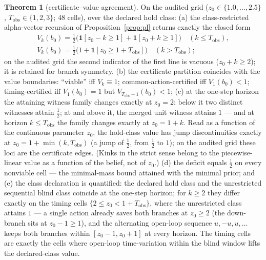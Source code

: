 \documentclass[10pt,twocolumn]{article}
\theoremstyle{definition}
\newtheorem{theorem}{Theorem}
\begin{document}
\begin{theorem}[certificate--value agreement]\label{thm:agree}
On the audited grid (\(z_{0} \in \{1.0, \dots, 2.5\}\),
\(T_{\mathrm{obs}} \in \{1,2,3\}\); 48 cells), over the declared hold
class: (a) the class-restricted alpha-vector recursion of
Proposition~\ref{prop:pl} returns exactly the closed form
\begin{gather*}
V_{k}(b_{0}) = \tfrac{1}{2}\bigl(\mathbf{1}[z_{0} - k \ge 1] +
\mathbf{1}[z_{0} + k \ge 1]\bigr) \quad (k \le T_{\mathrm{obs}}),\\
V_{k}(b_{0}) = \tfrac{1}{2}\bigl(1 + \mathbf{1}[z_{0} \ge 1 +
T_{\mathrm{obs}}]\bigr) \quad (k > T_{\mathrm{obs}});
\end{gather*}
on the audited grid the second indicator of the first line is vacuous
(\(z_{0} + k \ge 2\)); it is retained for branch symmetry.
(b) the certificate partition coincides with the value boundaries:
``viable'' iff \(V_{k} \equiv 1\); common-action-certified iff
\(V_{1}(b_{0}) < 1\); timing-certified iff \(V_{1}(b_{0}) = 1\) but
\(V_{T_{\mathrm{obs}}+1}(b_{0}) < 1\);
(c) at the one-step horizon the attaining witness family changes exactly
at \(z_{0} = 2\): below it two distinct witnesses attain
\(\tfrac12\); at and above it, the merged unit witness attains \(1\) —
and at horizon \(k \le T_{\mathrm{obs}}\) the family changes exactly at
\(z_{0} = 1 + k\). Read as a function of the continuous parameter
\(z_{0}\), the hold-class value has jump discontinuities exactly at
\(z_{0} = 1 + \min(k, T_{\mathrm{obs}})\) (a jump of
\(\tfrac12\), from \(\tfrac12\) to \(1\)); on the audited grid these loci
are the certificate edges. (Kinks in the strict sense belong to the
piecewise-linear value as a function of the belief, not of \(z_{0}\).)
(d) the deficit equals \(\tfrac12\) on every nonviable cell --- the
minimal-mass bound attained with the minimal prior; and
(e) the class declaration is quantified: the declared hold class and the
unrestricted sequential blind class coincide at the one-step horizon; for
\(k \ge 2\) they differ exactly on the timing cells
\(\{2 \le z_{0} < 1 + T_{\mathrm{obs}}\}\), where the unrestricted class
attains \(1\) --- a single action already saves both branches at
\(z_{0} \ge 2\) (the down-branch sits at \(z_{0} - 1 \ge 1\)), and the
alternating open-loop sequence \(u, -u, u, \dots\) keeps both branches
within \([z_{0}-1, z_{0}+1]\) at every horizon. The timing cells are
exactly the cells where open-loop time-variation within the blind window
lifts the declared-class value.
\end{theorem}
\end{document}
